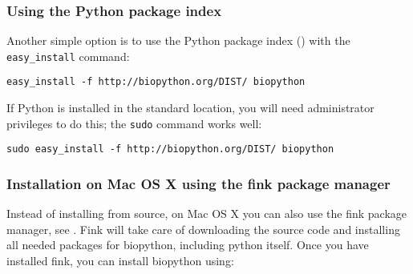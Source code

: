 \documentclass{article}
\begin{document}
\subsubsection{Using the Python package index}

Another simple option is to use the Python package index
() with the \verb|easy_install|
command:

\begin{verbatim}
easy_install -f http://biopython.org/DIST/ biopython
\end{verbatim}

If Python is installed in the standard location, you will need administrator
privileges to do this; the \verb|sudo| command works well:

\begin{verbatim}
sudo easy_install -f http://biopython.org/DIST/ biopython
\end{verbatim}

% 
% 
% 
% 

\subsubsection{Installation on Mac OS X using the fink package manager}

Instead of installing from source, on Mac OS X you can also use the fink package manager, see . Fink will take care of downloading the source code and installing all needed packages for biopython, including python itself. Once you have installed fink, you can install biopython using:
\end{document}
